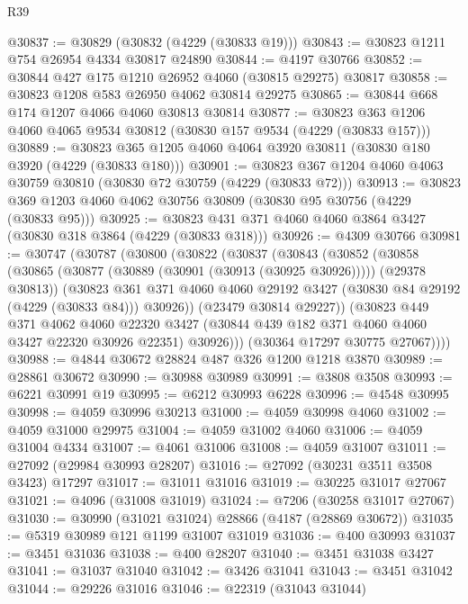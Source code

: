 \begin{lexlean}{R39}
\begin{coremodule}
@30837 := @30829 (@30832 (@4229 (@30833 @19)))
@30843 := @30823 @1211 @754 @26954 @4334 @30817 @24890
@30844 := @4197 @30766
@30852 := @30844 @427 @175 @1210 @26952 @4060 (@30815 @29275) @30817
@30858 := @30823 @1208 @583 @26950 @4062 @30814 @29275
@30865 := @30844 @668 @174 @1207 @4066 @4060 @30813 @30814
@30877 := @30823 @363 @1206 @4060 @4065 @9534 @30812 (@30830 @157 @9534 (@4229 (@30833 @157)))
@30889 := @30823 @365 @1205 @4060 @4064 @3920 @30811 (@30830 @180 @3920 (@4229 (@30833 @180)))
@30901 := @30823 @367 @1204 @4060 @4063 @30759 @30810 (@30830 @72 @30759 (@4229 (@30833 @72)))
@30913 := @30823 @369 @1203 @4060 @4062 @30756 @30809 (@30830 @95 @30756 (@4229 (@30833 @95)))
@30925 := @30823 @431 @371 @4060 @4060 @3864 @3427 (@30830 @318 @3864 (@4229 (@30833 @318)))
@30926 := @4309 @30766
@30981 := @30747
    (@30787
      (@30800
        (@30822
          (@30837
            (@30843
              (@30852
                (@30858
                  (@30865 (@30877 (@30889 (@30901 (@30913 (@30925 @30926))))) (@29378 @30813))
                  (@30823
                    @361
                    @371
                    @4060
                    @4060
                    @29192
                    @3427
                    (@30830 @84 @29192 (@4229 (@30833 @84)))
                    @30926))
                (@23479 @30814 @29227))
              (@30823
                @449
                @371
                @4062
                @4060
                @22320
                @3427
                (@30844 @439 @182 @371 @4060 @4060 @3427 @22320 @30926 @22351)
                @30926)))
          (@30364 @17297 @30775 @27067))))
@30988 := @4844 @30672 @28824 @487 @326 @1200 @1218 @3870
@30989 := @28861 @30672
@30990 := @30988 @30989
@30991 := @3808 @3508
@30993 := @6221 @30991 @19
@30995 := @6212 @30993 @6228
@30996 := @4548 @30995
@30998 := @4059 @30996 @30213
@31000 := @4059 @30998 @4060
@31002 := @4059 @31000 @29975
@31004 := @4059 @31002 @4060
@31006 := @4059 @31004 @4334
@31007 := @4061 @31006
@31008 := @4059 @31007
@31011 := @27092 (@29984 @30993 @28207)
@31016 := @27092 (@30231 @3511 @3508 @3423) @17297
@31017 := @31011 @31016
@31019 := @30225 @31017 @27067
@31021 := @4096 (@31008 @31019)
@31024 := @7206 (@30258 @31017 @27067)
@31030 := @30990 (@31021 @31024) @28866 (@4187 (@28869 @30672))
@31035 := @5319 @30989 @121 @1199 @31007 @31019
@31036 := @400 @30993
@31037 := @3451 @31036
@31038 := @400 @28207
@31040 := @3451 @31038 @3427
@31041 := @31037 @31040
@31042 := @3426 @31041
@31043 := @3451 @31042
@31044 := @29226 @31016
@31046 := @22319 (@31043 @31044)

\end{coremodule}
\end{lexlean}

